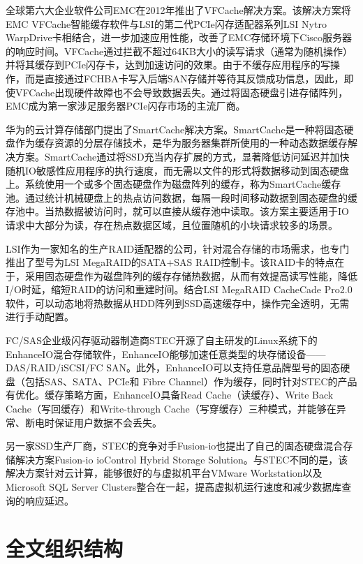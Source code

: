 全球第六大企业软件公司EMC在2012年推出了VFCache解决方案\cite{vfcache}。该解决方案将EMC VFCache智能缓存软件与LSI的第二代PCIe闪存适配器系列LSI Nytro WarpDrive卡相结合，进一步加速应用性能，改善了EMC存储环境下Cisco服务器的响应时间。VFCache通过拦截不超过64KB大小的读写请求（通常为随机操作）并将其缓存到PCIe闪存卡，达到加速访问的效果。由于不缓存应用程序的写操作，而是直接通过FCHBA卡写入后端SAN存储并等待其反馈成功信息，因此，即使VFCache出现硬件故障也不会导致数据丢失。通过将固态硬盘引进存储阵列，EMC成为第一家涉足服务器PCIe闪存市场的主流厂商。

华为的云计算存储部门提出了SmartCache解决方案\cite{smartcache}。SmartCache是一种将固态硬盘作为缓存资源的分层存储技术，是华为服务器集群所使用的一种动态数据缓存解决方案。SmartCache通过将SSD充当内存扩展的方式，显著降低访问延迟并加快随机IO敏感性应用程序的执行速度，而无需以文件的形式将数据移动到固态硬盘上。系统使用一个或多个固态硬盘作为磁盘阵列的缓存，称为SmartCache缓存池。通过统计机械硬盘上的热点访问数据，每隔一段时间移动数据到固态硬盘的缓存池中。当热数据被访问时，就可以直接从缓存池中读取。该方案主要适用于IO请求中大部分为读，存在热点数据区域，且位置随机的小块请求较多的场景。

LSI作为一家知名的生产RAID适配器的公司，针对混合存储的市场需求，也专门推出了型号为LSI MegaRAID的SATA+SAS RAID控制卡。该RAID卡的特点在于，采用固态硬盘作为磁盘阵列的缓存存储热数据，从而有效提高读写性能，降低I/O时延，缩短RAID的访问和重建时间。结合LSI MegaRAID CacheCade Pro2.0软件\cite{lsiraidcache}，可以动态地将热数据从HDD阵列到SSD高速缓存中，操作完全透明，无需进行手动配置。

FC/SAS企业级闪存驱动器制造商STEC开源了自主研发的Linux系统下的EnhanceIO混合存储软件\cite{enhanceio}，EnhanceIO能够加速任意类型的块存储设备——DAS/RAID/iSCSI/FC SAN。此外，EnhanceIO可以支持任意品牌型号的固态硬盘（包括SAS、SATA、PCIe和 Fibre Channel）作为缓存，同时针对STEC的产品有优化。缓存策略方面，EnhanceIO具备Read Cache（读缓存）、Write Back Cache（写回缓存）和Write-through Cache（写穿缓存）三种模式，并能够在异常、断电时保证用户数据不会丢失。

另一家SSD生产厂商，STEC的竞争对手Fusion-io也提出了自己的固态硬盘混合存储解决方案Fusion-io ioControl Hybrid Storage Solution\cite{fusionio}。与STEC不同的是，该解决方案针对云计算，能够很好的与虚拟机平台VMware Workstation以及Microsoft SQL Server Clusters整合在一起，提高虚拟机运行速度和减少数据库查询的响应延迟。

\section{全文组织结构}
\label{sec:organization}

